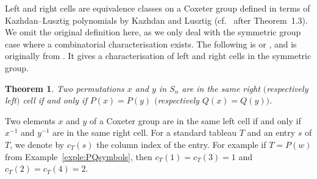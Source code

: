 \documentclass[pdftex]{sigma}
\numberwithin{equation}{section}
\newtheorem{Theorem}{Theorem}[section]
\newcommand{\inv}{^{-1}}
\begin{document}
Left and right cells are equivalence classes on a Coxeter group defined in terms of Kazhdan--Lusztig polynomials by Kazhdan and Lusztig (cf.~\cite{KL79} after Theorem~1.3). We omit the original definition here, as we only deal with the symmetric group case where a combinatorial characterisation exists. The following is
\cite[Theorem~A]{ariki} or \cite[Fact~8]{gm}, and is originally from \cite[Section~5]{KL79}.
It gives a characterisation of left and right cells in the symmetric group.

\begin{Theorem}\label{thm:defnCells}
Two permutations $x$ and $y$ in $S_n$ are in the same right $($respectively left$)$ cell if and only if $P(x)=P(y)$ $($respectively $Q(x)=Q(y))$.
\end{Theorem}

Two elements $x$ and $y$ of a Coxeter group are in the same left cell if and only if $x\inv$ and $y\inv$ are in the same right cell.
For a standard tableau $T$ and an entry $s$ of $T$, we denote by $c_T(s)$ the column index of the entry. For example if $T=P(w)$ from Example~\ref{exple:PQsymbols}, then
\(c_T(1)=c_T(3)=1\) and \(c_T(2)=c_T(4)=2\).
\end{document}
